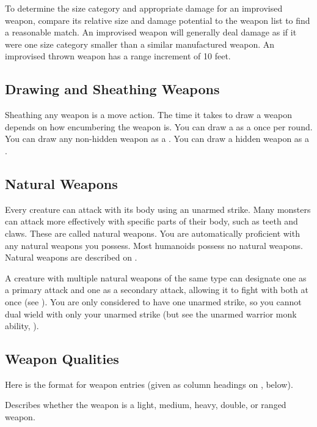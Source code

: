         To determine the size category and appropriate damage for an improvised weapon, compare its relative size and damage potential to the weapon list to find a reasonable match. An improvised weapon will generally deal damage as if it were one size category smaller than a similar manufactured weapon. An improvised thrown weapon has a range increment of 10 feet.

    \subsection{Drawing and Sheathing Weapons}\label{Drawing and Sheathing Weapons}
        Sheathing any weapon is a move action.
        The time it takes to draw a weapon depends on how encumbering the weapon is.
        You can draw a  as a  once per round.
        You can draw any non-hidden weapon as a .
        You can draw a hidden weapon as a .

    \subsection{Natural Weapons}\label{Natural Weapons}
        Every creature can attack with its body using an unarmed strike. Many monsters can attack more effectively with specific parts of their body, such as teeth and claws. These are called natural weapons. You are automatically proficient with any natural weapons you possess. Most humanoids possess no natural weapons. Natural weapons are described on .

        A creature with multiple natural weapons of the same type can designate one as a primary attack and one as a secondary attack, allowing it to fight with both at once (see ). You are only considered to have one unarmed strike, so you cannot dual wield with only your unarmed strike (but see the unarmed warrior monk ability, ).

    \subsection{Weapon Qualities}
        Here is the format for weapon entries (given as column headings on , below).

         Describes whether the weapon is a light, medium, heavy, double, or ranged weapon.

